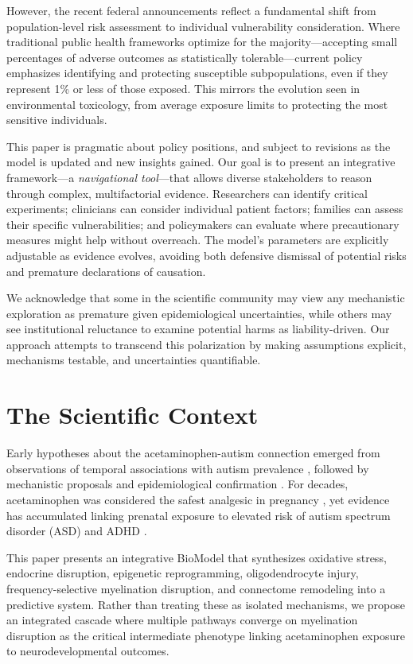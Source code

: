 \documentclass[11pt]{article}
\let\oldsection\section
\renewcommand{\section}[1]{\oldsection{#1}\setlength{\leftskip}{0em}}
\begin{document}
However, the recent federal announcements reflect a fundamental shift from population-level risk assessment to individual vulnerability consideration. Where traditional public health frameworks optimize for the majority—accepting small percentages of adverse outcomes as statistically tolerable—current policy emphasizes identifying and protecting susceptible subpopulations, even if they represent 1\% or less of those exposed. This mirrors the evolution seen in environmental toxicology, from average exposure limits to protecting the most sensitive individuals.

This paper is pragmatic about policy positions, and subject to revisions as the model is updated and new insights gained.  Our goal is to present an integrative framework—a \textit{navigational tool}—that allows diverse stakeholders to reason through complex, multifactorial evidence. Researchers can identify critical experiments; clinicians can consider individual patient factors; families can assess their specific vulnerabilities; and policymakers can evaluate where precautionary measures might help without overreach. The model's parameters are explicitly adjustable as evidence evolves, avoiding both defensive dismissal of potential risks and premature declarations of causation.

We acknowledge that some in the scientific community may view any mechanistic exploration as premature given epidemiological uncertainties, while others may see institutional reluctance to examine potential harms as liability-driven. Our approach attempts to transcend this polarization by making assumptions explicit, mechanisms testable, and uncertainties quantifiable.

\section{The Scientific Context}

Early hypotheses about the acetaminophen-autism connection emerged from observations of temporal associations with autism prevalence \citep{schultz2008, torres2003, shaw2013}, followed by mechanistic proposals \citep{parker2020} and epidemiological confirmation \citep{liew2016, avella-garcia2016}. For decades, acetaminophen was considered the safest analgesic in pregnancy \citep{kristensen2016}, yet evidence has accumulated linking prenatal exposure to elevated risk of autism spectrum disorder (ASD) and ADHD \citep{masarwa2018, chen2023}.

This paper presents an integrative BioModel that synthesizes oxidative stress, endocrine disruption, epigenetic reprogramming, oligodendrocyte injury, frequency-selective myelination disruption, and connectome remodeling into a predictive system. Rather than treating these as isolated mechanisms, we propose an integrated cascade where multiple pathways converge on myelination disruption as the critical intermediate phenotype linking acetaminophen exposure to neurodevelopmental outcomes.
\end{document}

